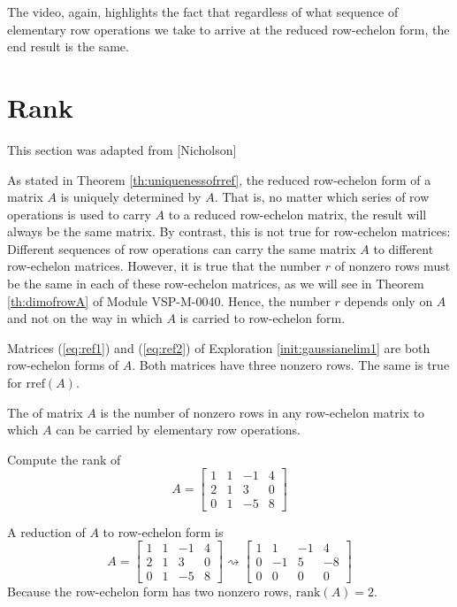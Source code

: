 \documentclass{ximera}
\begin{document}

The video, again, highlights the fact that regardless of what sequence of elementary row operations we take to arrive at the reduced row-echelon form, the end result is the same.  



\section*{Rank}
This section was adapted from [Nicholson]

As stated in Theorem \ref{th:uniquenessofrref}, the reduced row-echelon form of a matrix $A$ is uniquely determined by $A$. That is, no matter which series of row operations is used to carry $A$ to a reduced row-echelon matrix, the result will always be the same matrix. By contrast, this is not true for row-echelon matrices: Different sequences of row operations can carry the same matrix $A$ to different row-echelon matrices. However, it is true that the number $r$ of nonzero rows must be the same in each of these row-echelon matrices, as we will see in Theorem \ref{th:dimofrowA} of Module VSP-M-0040. Hence, the number $r$ depends only on $A$ and not on the way in which $A$ is carried to row-echelon form.  

\begin{example}
Matrices (\ref{eq:ref1}) and (\ref{eq:ref2}) of Exploration \ref{init:gaussianelim1} are both row-echelon forms of $A$.  Both matrices have three nonzero rows.  The same is true for $\mbox{rref}(A)$.  
\end{example}

\begin{definition}\label{def:rankofamatrix}
The  of matrix $A$ is the number of nonzero rows in any row-echelon matrix to which $A$ can be carried by elementary row operations.
\end{definition}

\begin{example}
Compute the rank of 
$$A =  
\begin{bmatrix}
	1 & 1 & -1 & 4 \\
	2 & 1 &  3 & 0 \\
	0 & 1 & -5 & 8
\end{bmatrix}$$

\begin{explanation}
A reduction of $A$ to row-echelon form is
$$
A =  
\begin{bmatrix}
1 & 1 & -1 & 4 \\
2 & 1 &  3 & 0 \\
0 & 1 & -5 & 8
\end{bmatrix} \rightsquigarrow\begin{bmatrix}
1 & 1 & -1 & 4 \\
0 & -1 &  5 & -8 \\
0 &  0 & 0 & 0
\end{bmatrix} 
$$
Because the row-echelon form has two nonzero rows, $\mbox{rank}(A) = 2$.
\end{explanation}
\end{example}
\end{document}
